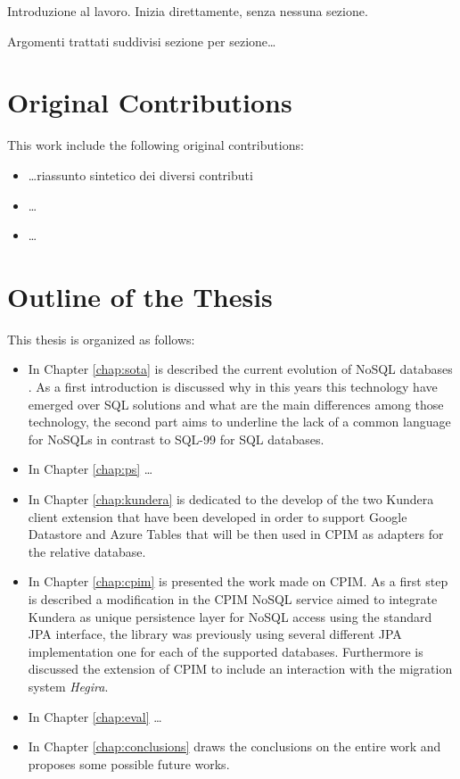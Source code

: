Introduzione al lavoro. Inizia direttamente, senza nessuna sezione.

\noindent Argomenti trattati suddivisi sezione per sezione\dots

\section*{Original Contributions}
This work include the following original contributions:
\begin{itemize}
\item \dots riassunto sintetico dei diversi contributi
\item \dots
\item \dots
\end{itemize}

\section*{Outline of the Thesis}
This thesis is organized as follows: 
\begin{itemize}
\item In Chapter \ref{chap:sota} is described the current evolution of NoSQL databases . As a first introduction is discussed why in this years this technology have emerged over SQL solutions and what are the main differences among those technology, the second part aims to underline the lack of a common language for NoSQLs in contrast to SQL-99 for SQL databases.
\item In Chapter \ref{chap:ps} \dots
\item In Chapter \ref{chap:kundera} is dedicated to the develop of the two Kundera client extension that have been developed in order to support Google Datastore and Azure Tables that will be then used in CPIM as adapters for the relative database.
\item In Chapter \ref{chap:cpim} is presented the work made on CPIM. As a first step is described a modification in the CPIM NoSQL service aimed to integrate Kundera as unique persistence layer for NoSQL access using the standard JPA interface, the library was previously using several different JPA implementation one for each of the supported databases. Furthermore is discussed the extension of CPIM to include an interaction with the migration system \textit{Hegira}.
\item In Chapter \ref{chap:eval} \dots
\item In Chapter \ref{chap:conclusions} draws the conclusions on the entire work and proposes some possible future works.
\end{itemize}

